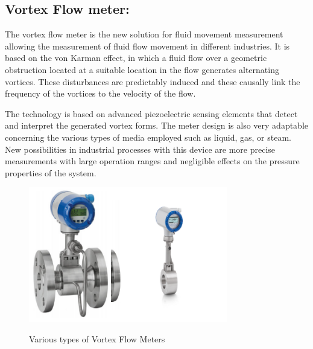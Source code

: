 \subsection{Vortex Flow meter:}

The vortex flow meter is the new solution for fluid movement measurement allowing the measurement of fluid flow movement in different industries. It is based on the von Karman effect, in which a fluid flow over a geometric obstruction located at a suitable location in the flow generates alternating vortices. These disturbances are predictably induced and these causally link the frequency of the vortices to the velocity of the flow.

The technology is based on advanced piezoelectric sensing elements that detect and interpret the generated vortex forms. The meter design is also very adaptable concerning the various types of media employed such as liquid, gas, or steam. New possibilities in industrial processes with this device are more precise measurements with large operation ranges and negligible effects on the pressure properties of the system.

\begin{figure}[h!]
    \centering
    \includegraphics[width=1.41806in,height=2.31944in]{figs/flowmeters/image7.png}\includegraphics[width=1.99792in,height=2.31944in]{figs/flowmeters/image8.png}
    \caption{Various types of Vortex Flow Meters}
    \label{fig:electric_flowmeters}
\end{figure}

